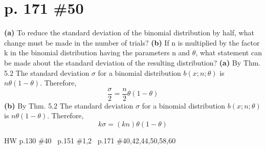 \documentclass[12pt]{article}
\begin{document}
	\section[20pt]{p. 171 \#50}
	\textbf{(a)} To reduce the standard deviation of the binomial distribution by half, what change must be made in the number of trials? \newline
	\textbf{(b)} If n is multiplied by the factor k in the binomial distribution having the parameters n and \(\theta\), what statement can be made about the standard deviation of the resulting distribution?
	\newline
	\newline
	\textbf{(a)} By Thm. 5.2 The standard deviation \(\sigma\) for a binomial distribution \(b(x;n;\theta)\) is \(n\theta(1-\theta)\). \newline
	Therefore, \[\frac{\sigma}{2}=\frac{n}{2}\theta(1-\theta)\]
	\newline
	\newline
	\newline
	\textbf{(b)} By Thm. 5.2 The standard deviation \(\sigma\) for a binomial distribution \(b(x;n;\theta)\) is \(n\theta(1-\theta)\). \newline
	Therefore,
	\[k\sigma=(kn)\theta(1-\theta)\]
	\newpage
	\maketitle HW p.130 \#40 \ p.151 \#1,2 \ p.171 \#40,42,44,50,58,60
\end{document}

